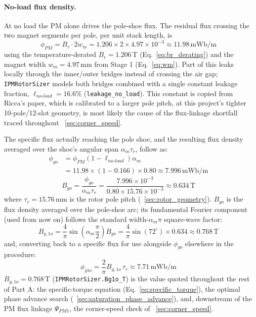 \documentclass[10pt,final,journal,a4paper,oneside,twocolumn]{IEEEtran}
\begin{document}
\paragraph{No-load flux density.} At no load the PM alone drives the pole-shoe flux. The residual flux crossing the two magnet segments per pole, per unit stack length, is
\begin{equation}
    \label{eq:phi_pm}
    \phi_{PM} = B_r \cdot 2w_m = 1.206\times2\times4.97\times10^{-3} \approx 11.98\,\text{mWb/m}
\end{equation}
using the temperature-derated $B_r=1.206\,\text{T}$ (Eq.~\ref{eq:br_derating}) and the magnet width $w_m=4.97\,\text{mm}$ from Stage 1 (Eq.~\ref{eq:wm}). Part of this leaks locally through the inner/outer bridges instead of crossing the air gap; \texttt{IPMRotorSizer} models both bridges combined with a single constant leakage fraction, $\ell_{no\text{-}load}=16.6\%$ (\texttt{leakage\_no\_load}). This constant is copied from Ricca's paper, which is calibrated to a larger pole pitch, at this project's tighter 10-pole/12-slot geometry, is most likely the cause of the flux-linkage shortfall traced throughout \sectionname~\ref{sec:corner_speed}.

The specific flux actually reaching the pole shoe, and the resulting flux density averaged over the shoe's angular span $\alpha_m\tau_r$, follow as:
\begin{equation}
    \label{eq:phi_go}
    \begin{split}
    \phi_{go} &= \phi_{PM}\left(1-\ell_{no\text{-}load}\right)\alpha_m \\
    &= 11.98\times(1-0.166)\times0.80 \approx 7.996\,\text{mWb/m}
    \end{split}
\end{equation}
\begin{equation}
    \label{eq:b_go}
    B_{go} = \frac{\phi_{go}}{\alpha_m\tau_r} = \frac{7.996\times10^{-3}}{0.80\times15.76\times10^{-3}} \approx 0.634\,\text{T}
\end{equation}
where $\tau_r=15.76\,\text{mm}$ is the rotor pole pitch (\sectionname~\ref{sec:rotor_geometry}). $B_{go}$ is the flux density averaged over the pole-shoe arc; its fundamental Fourier component (used from now on) follows the standard width-$\alpha_m\pi$ square-wave factor:
\begin{equation}
    \label{eq:bg1o}
    B_{g,1o} = \frac{4}{\pi}\sin\!\left(\alpha_m\frac{\pi}{2}\right)B_{go} = \frac{4}{\pi}\sin(72^\circ)\times0.634 \approx 0.768\,\text{T}
\end{equation}
and, converting back to a specific flux for use alongside $\phi_{go}$ elsewhere in the procedure:
\begin{equation}
    \label{eq:phi_g1o}
    \phi_{g1o} = \frac{2}{\pi}B_{g,1o}\,\tau_r \approx 7.71\,\text{mWb/m}
\end{equation}
$B_{g,1o}=0.768\,\text{T}$ (\texttt{IPMRotorSizer.Bg1o\_T}) is the value quoted throughout the rest of Part A: the specific-torque equation (Eq.~\ref{eq:specific_torque}), the optimal phase advance search (\sectionname~\ref{sec:saturation_phase_advance}), and, downstream of the PM flux linkage $\Psi_{PM1}$, the corner-speed check of \sectionname~\ref{sec:corner_speed}.
\end{document}
